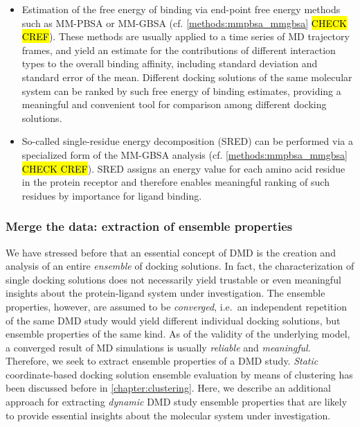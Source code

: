 \begin{itemize}
\item Estimation of the free energy of binding via end-point free energy methods
such as MM-PBSA or MM-GBSA (cf. \cref{methods:mmpbsa_mmgbsa} \hl{CHECK CREF}).
These methods are usually applied to a time series of MD trajectory frames, and
yield an estimate for the contributions of different interaction types to the
overall binding affinity, including standard deviation and standard error of the
mean. Different docking solutions of the same molecular system can be ranked by
such free energy of binding estimates, providing a meaningful and convenient
tool for comparison among different docking solutions.

\item So-called single-residue energy decomposition (SRED) can be performed via
a specialized form of the MM-GBSA analysis (cf. \cref{methods:mmpbsa_mmgbsa}
\hl{CHECK CREF}). SRED assigns an energy value for each amino acid residue in
the protein receptor and therefore enables meaningful ranking of such residues
by importance for ligand binding.
\end{itemize}


\subsubsection{Merge the data: extraction of ensemble properties}

We have stressed before that an essential concept of DMD is the creation and
analysis of an entire \textit{ensemble} of docking solutions. In fact, the
characterization of single docking solutions does not necessarily yield
trustable or even meaningful insights about the protein-ligand system under
investigation. The ensemble properties, however, are assumed to be
\textit{converged}, i.e.\ an independent repetition of the same DMD study would
yield different individual docking solutions, but ensemble properties of the
same kind. As of the validity of the underlying model, a converged result of MD
simulations is usually \textit{reliable} and \textit{meaningful}. Therefore, we
seek to extract ensemble properties of a DMD study. \textit{Static}
coordinate-based docking solution ensemble evaluation by means of clustering has
been discussed before in \cref{chapter:clustering}. Here, we describe an
additional approach for extracting \textit{dynamic} DMD study ensemble
properties that are likely to provide essential insights about the molecular
system under investigation.

